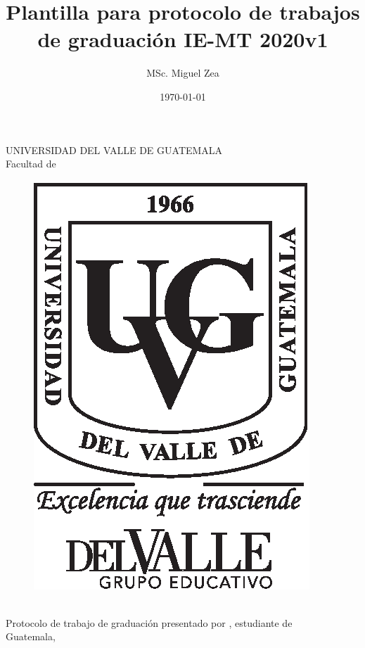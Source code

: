 \documentclass[11pt, letterpaper, twoside, openright]{report}
\title{Plantilla para protocolo de trabajos de graduación IE-MT 2020v1}
\author{MSc. Miguel Zea}
\date{\today}
\begin{document}
\graphicspath{{figuras/}}


\newpage
\cleardoublepage{}
\pagecolor{white}
\color{black}
\setcounter{page}{1}
\thispagestyle{empty}
\begin{center}
	\LARGE UNIVERSIDAD DEL VALLE DE GUATEMALA\\
	\LARGE Facultad de \uvgfacultad \\[0.75cm]
\end{center}
\begin{figure}[h]
	\begin{center}
	\includegraphics[height=5.5 cm]{plantilla/escudoUVGnegro.eps}
	\vspace{0.5in}
	\end{center}
\end{figure}
\begin{center}
	\Large \textbf{\nohyphens{\titulotesis}} \\
	\vfill
	\Large \nohyphens{Protocolo de trabajo de graduación presentado por \nombreestudiante, estudiante de \uvgcarrera} \\
	\vfill
	\large Guatemala, \\
	\vspace{1em}
	\anoentrega
\end{center}


\pagestyle{plain}

\newpage
\cleardoublepage
{}
\setcounter{page}{1}
\end{document}
